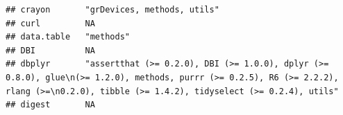 \documentclass[]{article}
\begin{document}
\begin{verbatim}
## crayon       "grDevices, methods, utils"                                                                                                                                                                                                                                                                                                                                                                                                                                                           
## curl         NA                                                                                                                                                                                                                                                                                                                                                                                                                                                                                    
## data.table   "methods"                                                                                                                                                                                                                                                                                                                                                                                                                                                                             
## DBI          NA                                                                                                                                                                                                                                                                                                                                                                                                                                                                                    
## dbplyr       "assertthat (>= 0.2.0), DBI (>= 1.0.0), dplyr (>= 0.8.0), glue\n(>= 1.2.0), methods, purrr (>= 0.2.5), R6 (>= 2.2.2), rlang (>=\n0.2.0), tibble (>= 1.4.2), tidyselect (>= 0.2.4), utils"                                                                                                                                                                                                                                                                                             
## digest       NA                                                                                                                                                                                                                                                                                                                                                                                                                                                                                    

\end{verbatim}
\end{document}
